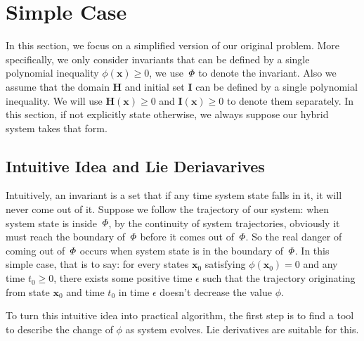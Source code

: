\documentclass{jssc}
\begin{document}
\section{Simple Case}
\label{sec:simple}
In this section, we focus on a simplified version of our original problem. More specifically, we only consider invariants that can be defined by a single polynomial inequality $\phi(\boldsymbol{x}) \geq 0$, we use ${\it \Phi}$ to denote the invariant. Also we assume that the domain $\boldsymbol{H}$ and initial set $\boldsymbol{I}$ can be defined by a single polynomial inequality. We will use $\boldsymbol{H}(\boldsymbol{x}) \geq 0$ and $\boldsymbol{I}(\boldsymbol{x}) \geq 0$ to denote them separately. In this section, if not explicitly state otherwise, we always suppose our hybrid system takes that form.

\subsection{Intuitive Idea and Lie Deriavarives}
Intuitively, an invariant is a set that if any time system state falls in it, it will never come out of it. Suppose we follow the trajectory of our system: when system state is inside  ${\it \Phi}$, by the continuity of system trajectories, obviously it must reach the boundary of ${\it \Phi}$ before it comes out of ${\it \Phi}$. So the real danger of coming out of ${\it \Phi}$ occurs when system state is in the boundary of ${\it \Phi}$. In this simple case, that is to say: for every states $\boldsymbol{x}_0$ satisfying $\phi(\boldsymbol{x}_0) = 0$ and any time $t_0 \geq 0$, there exists some positive time $\epsilon$ such that the trajectory originating from state $\boldsymbol{x}_0$ and time $t_0$ in time $\epsilon$ doesn't decrease the value $\phi$.

To turn this intuitive idea into practical algorithm, the first step is to find a tool to describe the change of $\phi$ as system evolves. Lie derivatives are suitable for this.
\end{document}
